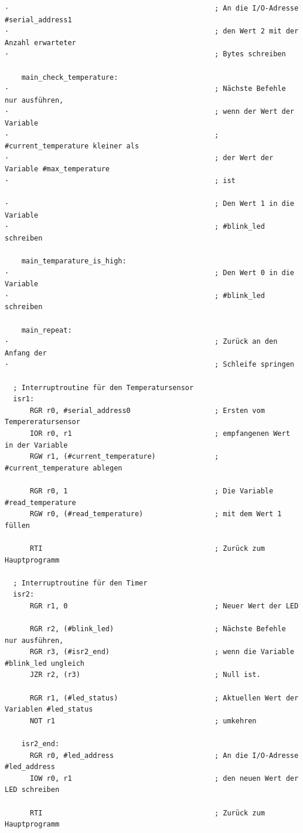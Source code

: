 {\begin{verbatim}
·                                                 ; An die I/O-Adresse #serial_address1
·                                                 ; den Wert 2 mit der Anzahl erwarteter
·                                                 ; Bytes schreiben

    main_check_temperature:
·                                                 ; Nächste Befehle nur ausführen,
·                                                 ; wenn der Wert der Variable
·                                                 ; #current_temperature kleiner als
·                                                 ; der Wert der Variable #max_temperature
·                                                 ; ist

·                                                 ; Den Wert 1 in die Variable
·                                                 ; #blink_led schreiben

    main_temparature_is_high:
·                                                 ; Den Wert 0 in die Variable
·                                                 ; #blink_led schreiben

    main_repeat:
·                                                 ; Zurück an den Anfang der
·                                                 ; Schleife springen

  ; Interruptroutine für den Temperatursensor
  isr1:
      RGR r0, #serial_address0                    ; Ersten vom Tempereratursensor
      IOR r0, r1                                  ; empfangenen Wert in der Variable
      RGW r1, (#current_temperature)              ; #current_temperature ablegen

      RGR r0, 1                                   ; Die Variable #read_temperature
      RGW r0, (#read_temperature)                 ; mit dem Wert 1 füllen

      RTI                                         ; Zurück zum Hauptprogramm

  ; Interruptroutine für den Timer
  isr2:
      RGR r1, 0                                   ; Neuer Wert der LED

      RGR r2, (#blink_led)                        ; Nächste Befehle nur ausführen,
      RGR r3, (#isr2_end)                         ; wenn die Variable #blink_led ungleich
      JZR r2, (r3)                                ; Null ist.

      RGR r1, (#led_status)                       ; Aktuellen Wert der Variablen #led_status
      NOT r1                                      ; umkehren

    isr2_end:
      RGR r0, #led_address                        ; An die I/O-Adresse #led_address
      IOW r0, r1                                  ; den neuen Wert der LED schreiben

      RTI                                         ; Zurück zum Hauptprogramm
\end{verbatim}
}



